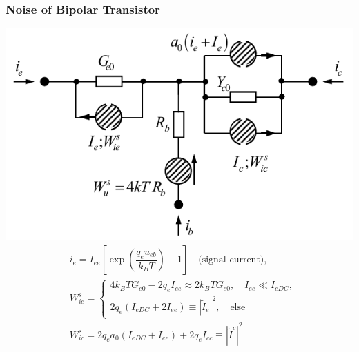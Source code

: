 \subsubsection{Noise of Bipolar Transistor}
\includegraphics[width=.3\textwidth]{content/hfcomp/pictures/bjt_noise_circuit.png}
\begin{align*}
    &i_e = I_{ee} \left[\exp\left(\dfrac{q_e u_{eb}}{k_B T}\right) - 1\right] \quad \text{(signal current)},\\
    &W_{ie}^s =
    \begin{cases}
        4k_B T G_{e0} - 2q_e I_{ee} \approx 2k_B T G_{e0}, \quad I_{ee} \ll I_{eDC},\\
        2q_e (I_{eDC} + 2 I_{ee}) \equiv |\tilde{I}_e|^2, \quad \text{else}
    \end{cases}\\
    &W_{ic}^s = 2q_e a_0 (I_{eDC} + I_{ee}) + 2q_e I_{cc} \equiv |\tilde{I}^c|^2
\end{align*}

